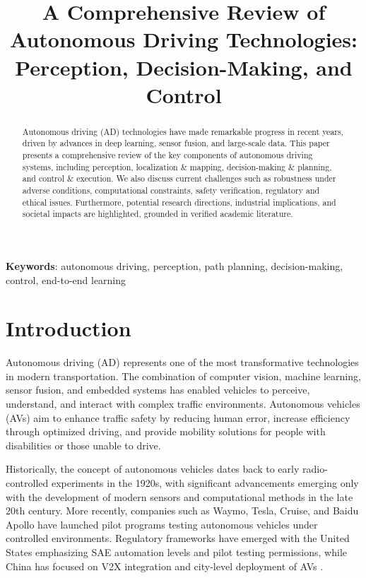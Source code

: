 \documentclass[12pt,a4paper]{article}
\title{A Comprehensive Review of Autonomous Driving Technologies: Perception, Decision-Making, and Control}
\author{} %
\date{} %
\begin{document}
\maketitle

\begin{abstract}
Autonomous driving (AD) technologies have made remarkable progress in recent years, driven by advances in deep learning, sensor fusion, and large-scale data. This paper presents a comprehensive review of the key components of autonomous driving systems, including perception, localization \& mapping, decision-making \& planning, and control \& execution. We also discuss current challenges such as robustness under adverse conditions, computational constraints, safety verification, regulatory and ethical issues. Furthermore, potential research directions, industrial implications, and societal impacts are highlighted, grounded in verified academic literature.
\end{abstract}

\noindent \textbf{Keywords}: autonomous driving, perception, path planning, decision-making, control, end-to-end learning

\section{Introduction}
Autonomous driving (AD) represents one of the most transformative technologies in modern transportation. The combination of computer vision, machine learning, sensor fusion, and embedded systems has enabled vehicles to perceive, understand, and interact with complex traffic environments. Autonomous vehicles (AVs) aim to enhance traffic safety by reducing human error, increase efficiency through optimized driving, and provide mobility solutions for people with disabilities or those unable to drive.

Historically, the concept of autonomous vehicles dates back to early radio-controlled experiments in the 1920s, with significant advancements emerging only with the development of modern sensors and computational methods in the late 20th century. More recently, companies such as Waymo, Tesla, Cruise, and Baidu Apollo have launched pilot programs testing autonomous vehicles under controlled environments. Regulatory frameworks have emerged with the United States emphasizing SAE automation levels and pilot testing permissions, while China has focused on V2X integration and city-level deployment of AVs \cite{zhang2023public}.
\end{document}
